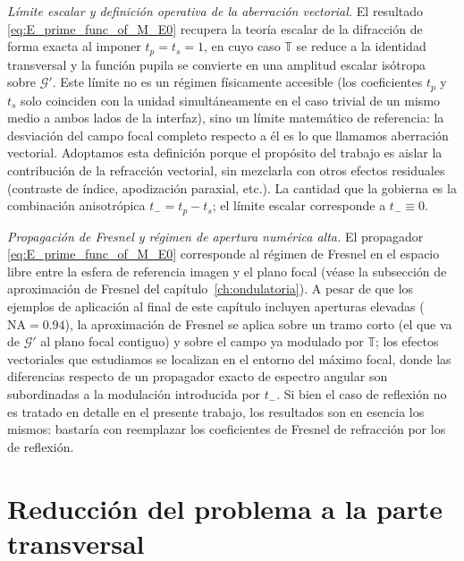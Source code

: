 \medskip

\noindent\textit{Límite escalar y definición operativa de la aberración vectorial.}
El resultado \eqref{eq:E_prime_func_of_M_E0} recupera la teoría escalar de
la difracción de forma exacta al imponer $t_p=t_s=1$, en cuyo caso
$\mathbb T$ se reduce a la identidad transversal y la función pupila se
convierte en una amplitud escalar isótropa sobre $\mathscr G'$. Este límite
no es un régimen físicamente accesible (los coeficientes $t_p$ y $t_s$
solo coinciden con la unidad simultáneamente en el caso trivial de un mismo
medio a ambos lados de la interfaz), sino un límite matemático de
referencia: la desviación del campo focal completo respecto a él es lo que
llamamos aberración vectorial. Adoptamos esta definición porque el
propósito del trabajo es aislar la contribución de la refracción vectorial,
sin mezclarla con otros efectos residuales (contraste de índice, apodización
paraxial, etc.). La cantidad que la gobierna es la combinación anisotrópica
$t_-=t_p-t_s$; el límite escalar corresponde a $t_-\equiv 0$.

\medskip

\noindent\textit{Propagación de Fresnel y régimen de apertura numérica alta.}
El propagador \eqref{eq:E_prime_func_of_M_E0} corresponde al régimen de
Fresnel en el espacio libre entre la esfera de referencia imagen y el plano
focal (véase la subsección de aproximación de Fresnel del
capítulo~\ref{ch:ondulatoria}). A pesar de que
los ejemplos de aplicación al final de este capítulo incluyen aperturas
elevadas ($\mathrm{NA}=0.94$), la aproximación de Fresnel se aplica sobre un
tramo corto (el que va de $\mathscr G'$ al plano focal contiguo) y sobre el
campo ya modulado por $\mathbb T$; los efectos vectoriales que estudiamos se
localizan en el entorno del máximo focal, donde las diferencias respecto de
un propagador exacto de espectro angular son subordinadas a la modulación
introducida por $t_-$. Si bien el caso de reflexión no es tratado en detalle en el presente trabajo, los resultados son en esencia los mismos: bastaría con reemplazar los coeficientes de Fresnel de refracción por los de reflexión.

\section{Reducción del problema a la parte transversal}

